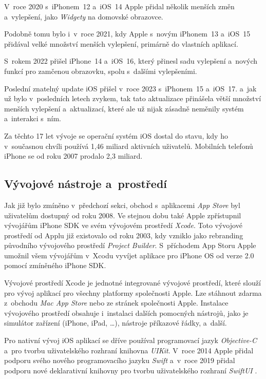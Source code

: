 V~roce 2020 s~iPhonem~12 a~iOS~14 Apple přidal několik menších změn a~vylepšení, jako \emph{Widgety} na domovské obrazovce.

Podobně tomu bylo i~v~roce 2021, kdy Apple s~novým iPhonem~13 a~iOS~15 přidával velké množství menších vylepšení, primárně do vlastních aplikací.

S~rokem 2022 přišel iPhone~14 a~iOS~16, který přinesl sadu vylepšení a~nových funkcí pro zamčenou obrazovku, spolu s~dalšími vylepšeními.

Poslední znatelný update iOS přišel v~roce 2023 s~iPhonem~15 a~iOS~17. a~jak už bylo v~posledních letech zvykem, tak tato aktualizace přinášela větší množství menších vylepšení a~aktualizací, které ale už nijak zásadně neměnily systém a~interakci s~ním. \cite{history-of-ios}

Za těchto 17 let vývoje se operační systém iOS dostal do stavu, kdy ho v~současnou chvíli používá 1,46 miliard aktivních uživatelů. Mobilních telefonů iPhone se od roku 2007 prodalo 2,3 miliard. \cite{iphone-user-statistics}

\subsection{Vývojové nástroje a~prostředí}\label{ios-dev-tools}

Jak již bylo zmíněno v~předchozí sekci, obchod s~aplikacemi \emph{App Store} byl uživatelům dostupný od roku 2008. Ve stejnou dobu také Apple zpřístupnil vývojářům iPhone SDK ve svém vývojovém prostředí \emph{Xcode}. Toto vývojové prostředí od Applu již existovalo od roku 2003, kdy vzniklo jako rebranding původního vývojového prostředí \emph{Project Builder}. S~příchodem App Storu Apple umožnil všem vývojářům v~Xcodu vyvíjet aplikace pro iPhone OS od verze 2.0 pomocí zmíněného iPhone SDK. 

Vývojové prostředí Xcode je jednotné integrované vývojové prostředí, které slouží pro vývoj aplikací pro všechny platformy společnosti Apple. Lze stáhnout zdarma z~obchodu \emph{Mac App Store} nebo ze stránek společnosti Apple. Instalace vývojového prostředí obsahuje i~instalaci dalších pomocných nástrojů, jako je simulátor zařízení (iPhone, iPad, \dots), nástroje příkazové řádky, a~další. \cite{xcode-history}

Pro nativní vývoj iOS aplikací se dříve používal programovací jazyk \emph{Objective-C} \cite{objc} a~pro tvorbu uživatelského rozhraní knihovna \emph{UIKit}. V~roce 2014 Apple přidal podporu svého nového programovacího jazyku \emph{Swift} \cite{swift} a~v~roce 2019 přidal podporu nové deklarativní knihovny pro tvorbu uživatelského rozhraní \emph{SwiftUI} \cite{swiftui}.

